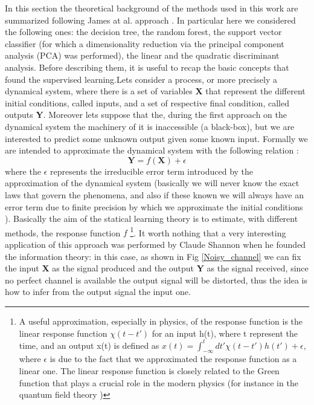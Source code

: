 \documentclass[
12pt, %
a4paper, %
oneside, %
headinclude,footinclude, %
BCOR5mm, %
]{scrartcl}
\begin{document}
In this section the theoretical background of the methods used in this work are summarized following James at al. approach \cite{james2013introduction}. In particular here we considered the following ones: the decision tree, the random forest, the support vector classifier (for which a dimensionality reduction via the principal component analysis (PCA) was performed), the linear and the quadratic discriminant analysis. 
Before describing them, it is useful to recap the basic concepts that found the supervised learning.\newline\newline Lets consider a process, or more precisely a dynamical system,  where there is a set of variables \textbf{X} that represent the different initial conditions, called inputs, and a set of respective final condition, called outputs \textbf{Y}. Moreover lets suppose that the, during the first approach on the dynamical system the machinery of it is inaccessible (a black-box), but we are interested to predict some unknown output given some known input. Formally we are intended to approximate the dynamical system with the following relation \cite{james2013introduction}: 
\begin{equation}
\textbf{Y}=f(\textbf{X})+\epsilon
\end{equation}
where the $\epsilon$ represents the irreducible error term introduced by the approximation of the dynamical system (basically we will never know the exact laws that govern the phenomena, and also if these known we will always have an error term due to finite precision by which we approximate the initial conditions \cite{prigogine2018order,prigogine1997end,petrosky1996liouville}). Basically the aim of the statical learning theory is to estimate, with different methods, the response function $f$ \footnote{A useful approximation, especially in physics, of the response function is the linear response function $\chi(t-t')$ for an input h(t), where t represent the time, and an output x(t) is defined as $x(t)=\int_{-\infty}^{t}dt'\chi(t-t')h(t')+\epsilon$, where $\epsilon$ is due to the fact that we approximated the response function as a linear one. The linear response function is closely related to the Green function that plays a crucial role in the modern physics (for instance in the quantum field theory \cite{kubo1957statistical,zee2010quantum})}. It worth nothing that a very interesting application of this approach was performed by Claude Shannon \cite{shannon2001mathematical,mackay2003information} when he founded the information theory: in this case, as shown in Fig \ref{Noisy_channel} we can fix the input \textbf{X} as the signal produced and the output \textbf{Y} as the signal received, since no perfect channel is available the output signal will be distorted, thus the idea is how to infer from the output signal the input one.
\end{document}
